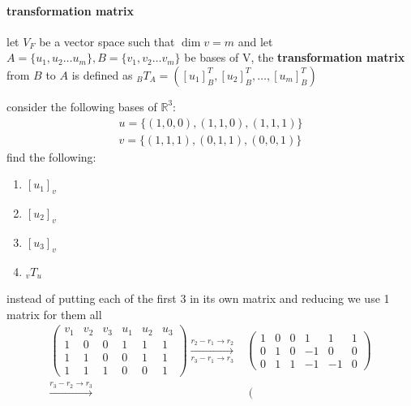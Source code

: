 \documentclass[a4paper,12pt]{article}
\begin{document}
\paragraph{transformation matrix}
\label{sec:orgda83b79}
\begin{definition}
let \(V_F\) be a vector space such that \(\dim v = m\) and let \(A=\{u_1,u_2\ldots u_m\},B=\{v_1,v_2\ldots v_m\}\) be bases of V, the \textbf{transformation matrix} from \(B\) to \(A\) is defined as \(_BT_A=([u_1]_B^T,[u_2]_B^T,\ldots,[u_m]_B^T)\)\\
\begin{question}
consider the following bases of \(\mathbb{R}^3\):\\
\begin{gather*}
  u = \{(1,0,0),(1,1,0),(1,1,1)\}\\
  v = \{(1,1,1),(0,1,1),(0,0,1)\}
\end{gather*}
find the following:\\
\begin{enumerate}
\item \([u_1]_v\)\\
\item \([u_2]_v\)\\
\item \([u_3]_v\)\\
\item \(_vT_u\)\\
\end{enumerate}
instead of putting each of the first 3 in its own matrix and reducing we use 1 matrix for them all\\
\begin{align*}
  \left(
    \begin{array}{ccc|ccc}
      v_1 & v_2 & v_3 & u_1 & u_2 & u_3\\
      \hline
      1 & 0 & 0 & 1 & 1 & 1\\
      1 & 1 & 0 & 0 & 1 & 1\\
      1 & 1 & 1 & 0 & 0 & 1
    \end{array}
  \right)
  \xrightarrow[r_3 - r_1 \to r_3]{r_2 - r_1 \to r_2}&
  \left(
    \begin{array}{ccc|ccc}
      1 & 0 & 0 & 1 & 1 & 1\\
      0 & 1 & 0 & -1 & 0 & 0\\
      0 & 1 & 1 & -1 & -1 & 0
    \end{array}
  \right)\\
  \xrightarrow{r_3 - r_2 \to r_3}&
  \left(
    \begin{array}{ccc|ccc}

\end{array}
\end{align*}
\end{question}
\end{definition}
\end{document}
